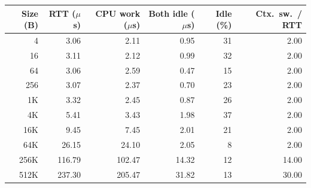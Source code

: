 \begin{tabular}{@{}rrrrrr@{}}
\toprule
Size (B) & RTT ($\mu$s) & CPU work ($\mu$s) & Both idle ($\mu$s) & Idle (\%) & Ctx.\ sw.\ / RTT \\
\midrule
4 & 3.06 & 2.11 & 0.95 & 31 & 2.00 \\
16 & 3.11 & 2.12 & 0.99 & 32 & 2.00 \\
64 & 3.06 & 2.59 & 0.47 & 15 & 2.00 \\
256 & 3.07 & 2.37 & 0.70 & 23 & 2.00 \\
1K & 3.32 & 2.45 & 0.87 & 26 & 2.00 \\
4K & 5.41 & 3.43 & 1.98 & 37 & 2.00 \\
16K & 9.45 & 7.45 & 2.01 & 21 & 2.00 \\
64K & 26.15 & 24.10 & 2.05 & 8 & 2.00 \\
256K & 116.79 & 102.47 & 14.32 & 12 & 14.00 \\
512K & 237.30 & 205.47 & 31.82 & 13 & 30.00 \\
\bottomrule
\end{tabular}
